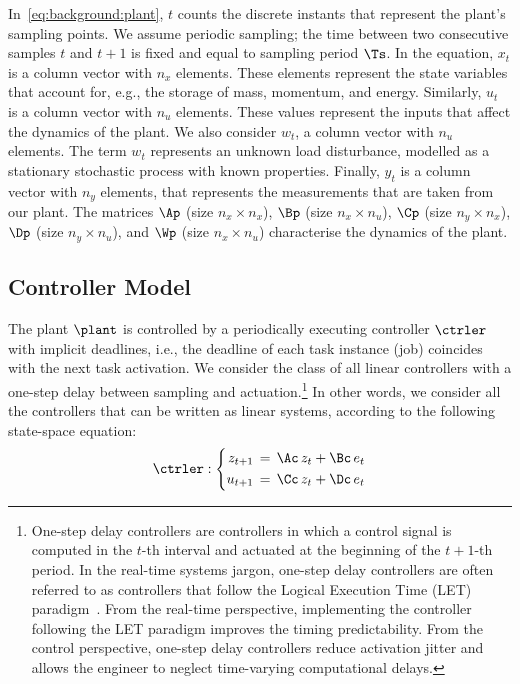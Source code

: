 In~\eqref{eq:background:plant}, $t$ counts the discrete instants that represent the plant's sampling points.
We assume periodic sampling; the time between two consecutive samples $t$ and $t+1$ is fixed and equal to sampling period $\Ts$.
In the equation, $x_t$ is a column vector with $n_x$ elements.
These elements represent the state variables that account for, e.g., the storage of mass, momentum, and energy.
Similarly, $u_t$ is a column vector with $n_u$ elements.
These values represent the inputs that affect the dynamics of the plant.
We also consider $w_t$, a column vector with $n_u$ elements.
The term $w_t$ represents an unknown load disturbance, modelled as a stationary stochastic process with known properties.
Finally, $y_t$ is a column vector with $n_y$ elements, that represents the measurements that are taken from our plant.
The matrices $\Ap$ (size $n_x \times n_x$), $\Bp$ (size $n_x \times n_u$), $\Cp$ (size $n_y \times n_x$), $\Dp$ (size $n_y \times n_u$), and $\Wp$ (size $n_x \times n_u$) characterise the dynamics of the plant.

\subsection{Controller Model}

The plant $\plant$ is controlled by a periodically executing controller $\ctrler$ with implicit deadlines, i.e., the deadline of each task instance (job) coincides with the next task activation.
We consider the class of all linear controllers with a one-step delay between sampling and actuation.\footnote{One-step delay controllers are controllers in which a control signal is computed in the $t$-th interval and actuated at the beginning of the $t+1$-th period. In the real-time systems jargon, one-step delay controllers are often referred to as controllers that follow the Logical Execution Time (LET) paradigm~\cite{Kirsch:2012, Ernst:2018}. From the real-time perspective, implementing the controller following the LET paradigm improves the timing predictability. From the control perspective, one-step delay controllers reduce activation jitter and allows the engineer to neglect time-varying computational delays.}
In other words, we consider all the controllers that can be written as linear systems, according to the following state-space equation:
\begin{equation}
\label{eq:background:controller}
    \ctrler : \left\{
    \begin{aligned}
        z_{t+1} &\,=\, \Ac\,z_t + \Bc\,e_t \\
        u_{t+1} &\,=\, \Cc\,z_t + \Dc\,e_t
    \end{aligned}
    \right.
\end{equation}

